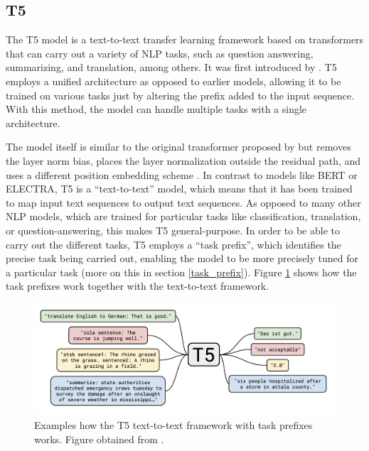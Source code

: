 \subsection{T5} \label{t5}

The T5 model is a text-to-text transfer learning framework based on transformers that can carry out a variety of NLP tasks, such as question answering, summarizing, and translation, among others. It was first introduced by \citet{raffel2020exploring}. T5 employs a unified architecture as opposed to earlier models, allowing it to be trained on various tasks just by altering the prefix added to the input sequence. With this method, the model can handle multiple tasks with a single architecture.

The model itself is similar to the original transformer proposed by \citet{vaswani2017attention} but removes the layer norm bias, places the layer normalization outside the residual path, and uses a different position embedding scheme \citep{raffel2020exploring}. In contrast to models like BERT or ELECTRA, T5 is a ``text-to-text'' model, which means that it has been trained to map input text sequences to output text sequences. As opposed to many other NLP models, which are trained for particular tasks like classification, translation, or question-answering, this makes T5 general-purpose. In order to be able to carry out the different tasks, T5 employs a ``task prefix'', which identifies the precise task being carried out, enabling the model to be more precisely tuned for a particular task (more on this in section \ref{task_prefix}). Figure \ref{fig:t5} shows how the task prefixes work together with the text-to-text framework.

\begin{figure}[h!]
\centering
\includegraphics[width = 1\linewidth]{figures/t5.png}
\caption{Examples how the T5 text-to-text framework with task prefixes works. Figure obtained from \citet{raffel2020exploring}.}
\label{fig:t5}
\end{figure}

